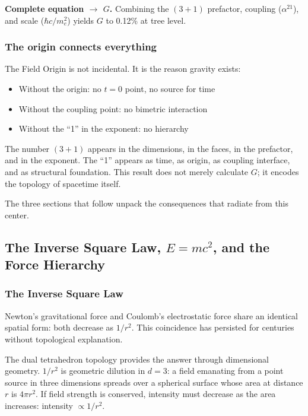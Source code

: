 \documentclass[aps,prd,preprint,superscriptaddress,showpacs,preprintnumbers,amsmath,amssymb,nofootinbib]{revtex4-2}
\begin{document}
\textbf{Complete equation $\rightarrow$ $G$.} Combining the $(3+1)$ prefactor, coupling ($\alpha^{21}$), and scale ($\hbar c/m_e^2$) yields $G$ to 0.12\% at tree level.

\subsubsection*{The origin connects everything}

The Field Origin is not incidental. It is the reason gravity exists:
\begin{itemize}
\item Without the origin: no $t = 0$ point, no source for time
\item Without the coupling point: no bimetric interaction
\item Without the ``1'' in the exponent: no hierarchy
\end{itemize}

The number $(3{+}1)$ appears in the dimensions, in the faces, in the prefactor, and in the exponent. The ``1'' appears as time, as origin, as coupling interface, and as structural foundation. This result does not merely calculate $G$; it encodes the topology of spacetime itself.

The three sections that follow unpack the consequences that radiate from this center.

\subsection{The Inverse Square Law, $E = mc^2$, and the Force Hierarchy}
\label{subsec:inverse-hierarchy}

\subsubsection*{The Inverse Square Law}

Newton's gravitational force and Coulomb's electrostatic force share an identical spatial form: both decrease as $1/r^2$. This coincidence has persisted for centuries without topological explanation.

The dual tetrahedron topology provides the answer through dimensional geometry. $1/r^2$ is geometric dilution in $d = 3$: a field emanating from a point source in three dimensions spreads over a spherical surface whose area at distance $r$ is $4\pi r^2$. If field strength is conserved, intensity must decrease as the area increases: intensity $\propto 1/r^2$.
\end{document}
